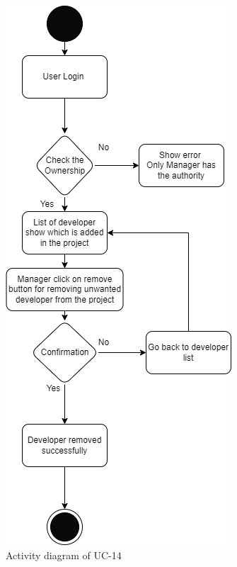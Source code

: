 \begin{figure}[H]
    \centering
    \includegraphics[scale=0.5]{./diagrams/Activity Diagram/ad-14.png}
    \caption{Activity diagram of UC-14}
    \label{fig:act-14}

\end{figure}


